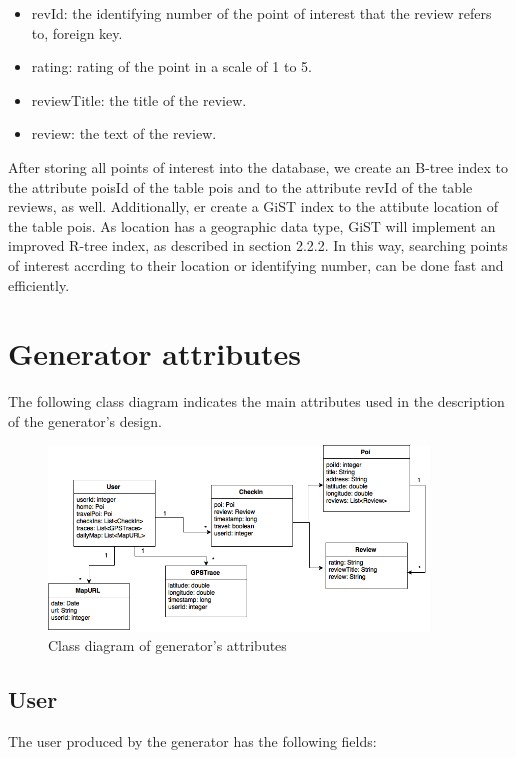 \begin{itemize}
 \item revId: the identifying number of the point of interest that the review refers to, foreign key.
 \item rating: rating of the point in a scale of 1 to 5.
 \item reviewTitle: the title of the review.
 \item review: the text of the review.
\end{itemize}

After storing all points of interest into the database, we create an B-tree index to the attribute poisId of the table pois and to the attribute revId of the table reviews, 
as well. Additionally, er create a GiST index to the attibute location of the table pois. As location has a geographic data type, GiST will implement an 
improved R-tree index, as described in section 2.2.2. In this way, searching points of interest accrding to their location or identifying number, can be done 
fast and efficiently.

\section{Generator attributes}

The following class diagram indicates the main attributes used in the description of the generator's design.

\begin{figure}[H]
  \centering
  \includegraphics[width=0.9\textwidth]{figures/class_diagram.png}
  \caption{Class diagram of generator's attributes}
\end{figure}

\subsection{User}

The user produced by the generator has the following fields:

